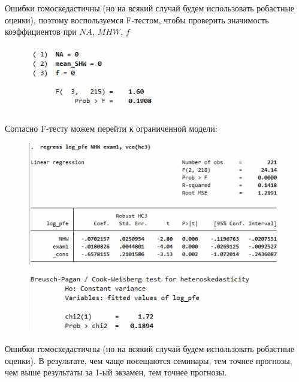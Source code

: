 \documentclass[12pt,a4paper, oneside]{extreport}
\begin{document}
Ошибки гомоскедастичны (но на всякий случай будем использовать робастные оценки), поэтому воспользуемся F-тестом, чтобы проверить значимость коэффициентов при $NA$, $MHW$, $f$

\begin{figure}[h!]
	\centering
	\includegraphics{screenshot019}
	\label{fig:screenshot019}
\end{figure}

\newpage


Согласно F-тесту можем перейти к ограниченной модели:

\begin{figure}[h!]
	\centering
	\includegraphics[width=0.7\linewidth]{screenshot022}
	\label{fig:screenshot020}
\end{figure}


\begin{figure}[h!]
	\centering
	\includegraphics{screenshot021}
	\label{fig:screenshot019}
\end{figure}


Ошибки гомоскедастичны (но на всякий случай будем использовать робастные оценки). В результате, чем чаще посещаются семинары, тем точнее прогнозы, чем выше результаты за 1-ый экзамен, тем точнее прогнозы. 
\end{document}
